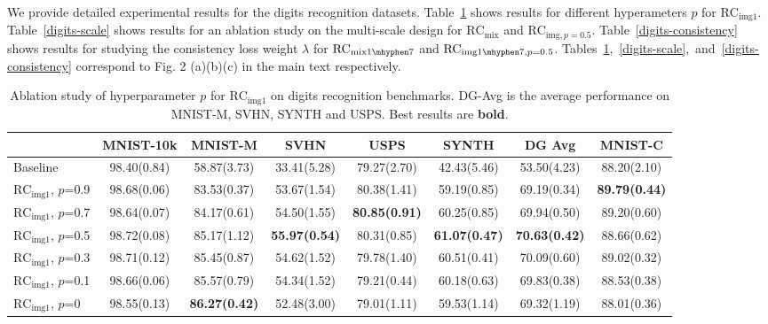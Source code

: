 \documentclass{article} \usepackage{iclr2021_conference,times}
\begin{document}
We provide detailed experimental results for the digits recognition datasets.  Table~\ref{digits-p} shows results for different hyperameters $p$ for $\text{RC}_{\text{img}{1}}$. Table~\ref{digits-scale} shows results for an ablation study on the multi-scale design for $\text{RC}_{\text{mix}}$ and $\text{RC}_{\text{img}, p=0.5}$. Table~\ref{digits-consistency} shows results for studying the consistency loss weight $\lambda$ for $\text{RC}_{\text{mix}1\mhyphen7}$ and $\text{RC}_{\text{img}1\mhyphen7, p=0.5}$. Tables~\ref{digits-p},~\ref{digits-scale},~and~\ref{digits-consistency} correspond to Fig. 2 (a)(b)(c) in the main text respectively.
\label{results}
\begin{table}[htp]
	\small
	\centering
\caption{Ablation study of hyperparameter $p$ for $\text{RC}_{\text{img}{1}}$ on digits recognition benchmarks. DG-Avg is the average performance on MNIST-M, SVHN, SYNTH and USPS. Best results are \textbf{bold}.}
	\label{digits-p}
	\begin{tabular}{l|c|ccccc|c}
		\toprule
		& MNIST-10k    & MNIST-M    & SVHN        & USPS        & SYNTH       & DG Avg         & MNIST-C     \\
		\midrule
		Baseline    & 98.40\tiny(0.84) & 58.87\tiny(3.73) & 33.41\tiny(5.28) & 79.27\tiny(2.70) & 42.43\tiny(5.46) & 53.50\tiny(4.23) & 88.20\tiny(2.10) \\
		$\text{RC}_{\text{img}{1}}$\tiny, $p$=0.9 & 98.68\tiny(0.06) & 83.53\tiny(0.37) & 53.67\tiny(1.54) & 80.38\tiny(1.41) & 59.19\tiny(0.85) & 69.19\tiny(0.34) & \textbf{89.79\tiny(0.44)} \\
		$\text{RC}_{\text{img}{1}}$\tiny, $p$=0.7 & 98.64\tiny(0.07) & 84.17\tiny(0.61) & 54.50\tiny(1.55) & \textbf{80.85\tiny(0.91)} & 60.25\tiny(0.85) & 69.94\tiny(0.50) & 89.20\tiny(0.60) \\
		$\text{RC}_{\text{img}{1}}$\tiny, $p$=0.5 & 98.72\tiny(0.08) & 85.17\tiny(1.12) & \textbf{55.97\tiny(0.54)} & 80.31\tiny(0.85) & \textbf{61.07\tiny(0.47)} & \textbf{70.63\tiny(0.42)} & 88.66\tiny(0.62) \\
		$\text{RC}_{\text{img}{1}}$\tiny, $p$=0.3 & 98.71\tiny(0.12) & 85.45\tiny(0.87) & 54.62\tiny(1.52) & 79.78\tiny(1.40) & 60.51\tiny(0.41) & 70.09\tiny(0.60) & {89.02\tiny(0.32)} \\
		$\text{RC}_{\text{img}{1}}$\tiny, $p$=0.1 & 98.66\tiny(0.06) & 85.57\tiny(0.79) & 54.34\tiny(1.52) & 79.21\tiny(0.44) & 60.18\tiny(0.63) & 69.83\tiny(0.38) & 88.53\tiny(0.38) \\
		$\text{RC}_{\text{img}{1}}$\tiny, $p$=0 & 98.55\tiny(0.13) & \textbf{86.27\tiny(0.42)} & 52.48\tiny(3.00) & 79.01\tiny(1.11) & 59.53\tiny(1.14) & 69.32\tiny(1.19) & 88.01\tiny(0.36) \\
		\bottomrule
	\end{tabular}
\end{table}
\end{document}
